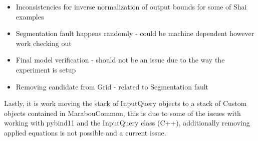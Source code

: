 \documentclass[a4paper,parskip=half]{scrartcl}
\begin{document}
\begin{itemize}
    \item Inconsistencies for inverse normalization of output bounds for some of Shai examples
    \item Segmentation fault happens randomly - could be machine dependent however work checking out
    \item Final model verification - should not be an issue due to the way the experiment is setup
    \item Removing candidate from Grid - related to Segmentation fault
\end{itemize} 

Lastly, it is work moving the stack of InputQuery objects to a stack of Custom objects contained in MarabouCommon, this is due to some of the issues with working with pybind11 and the InputQuery class (C++), additionally removing applied equations is not possible and a current issue.
\end{document}
